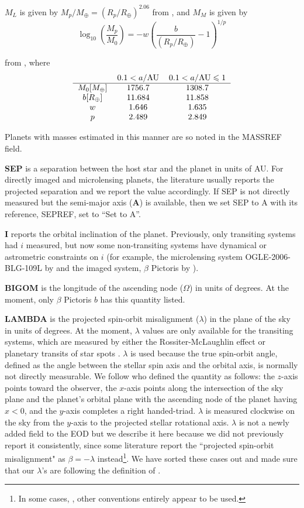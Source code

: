 \documentclass[11pt,preprint]{aastex}
\def\leq{\leqslant}
\def\rearth{R_\oplus}
\def\mearth{M_\oplus}
\begin{document}
\begin{CJK*}{UTF8}{gbsn}
$M_L$ is given by $M_{p}/\mearth=\left(R_{p}/\rearth\right)^{2.06}$ from \cite{Lissauer2011}, and $M_M$ is given by 
\[
\log_{10}\left(\frac{M_{p}}{M_0}\right)=-w\left(\frac{b}{\left(R_{p}/\rearth\right)}-1\right)^{1/p}
\]

\noindent from \cite{Mordasini2012}, where
\[
\begin{tabular}{ c c c }
  & $0.1<a/{\rm AU}$ & $0.1<a/{\rm AU} \leq 1$  \\ \hline $M_0[\mearth]$ & 1756.7 & 1308.7 \\
$b[\rearth]$ & 11.684 & 11.858 \\ $w$ & 1.646 & 1.635 \\ $p$ & 2.489 & 2.849 \\ 
\end{tabular}
\]

Planets with masses estimated in this manner are so noted in the
MASSREF field.

{\bf SEP} is a separation between the host star
and the planet in units of AU. For directly imaged and microlensing planets, the
literature usually reports the projected separation and we report the
value accordingly.  If SEP is not directly measured but the semi-major
axis ({\bf A}) is available, then we set SEP to A with its reference,
SEPREF, set to ``Set to A''. 

{\bf I} reports the orbital inclination of the planet. Previously,
only transiting systems had $i$ measured, but now some non-transiting
systems have dynamical or astrometric constraints on $i$ (for example,
the microlensing system OGLE-2006-BLG-109L by \citealt{Bennett2010}
and the imaged system, $\beta$ Pictoris by \citealt{Lagrange2009}).

{\bf BIGOM} is the longitude of the ascending node ($\Omega$) in units
of degrees. At the moment, only $\beta$ Pictoris $b$ has this quantity listed.

{\bf LAMBDA} is the projected spin-orbit misalignment ($\lambda$) in
the plane of the sky in units of degrees. At the moment, $\lambda$
values are only available for the transiting systems, which are
measured by either the Rossiter-McLaughlin effect
\citep[e.g.,][]{Winn2005} or planetary transits of star spots
\citep[e.g.,][]{Sanchis-Ojeda2012}. $\lambda$ is used because the true
spin-orbit angle, defined as the angle between the stellar spin axis
and the orbital axis, is normally not directly measurable. We follow
\cite{Fabrycky2009} who defined the quantity as follows: the $z$-axis
points toward the observer, the $x$-axis points along the intersection
of the sky plane and the planet's orbital plane with the ascending
node of the planet having $x<0$, and the $y$-axis completes a right
handed-triad. $\lambda$ is measured clockwise on the sky from the
$y$-axis to the projected stellar rotational axis. $\lambda$ is not a
newly added field to the EOD but we describe it here because we did
not previously report it consistently, since some literature report
the ``projected spin-orbit misalignment" as $\beta = -\lambda$
instead\footnote{In some cases, \citep[e.g.][]{Moutou2011}, other
  conventions entirely appear to be used.}. We have sorted these cases
out and made sure that our $\lambda$'s are following the definition of
\cite{Fabrycky2009}.


\end{CJK*}
\end{document}
